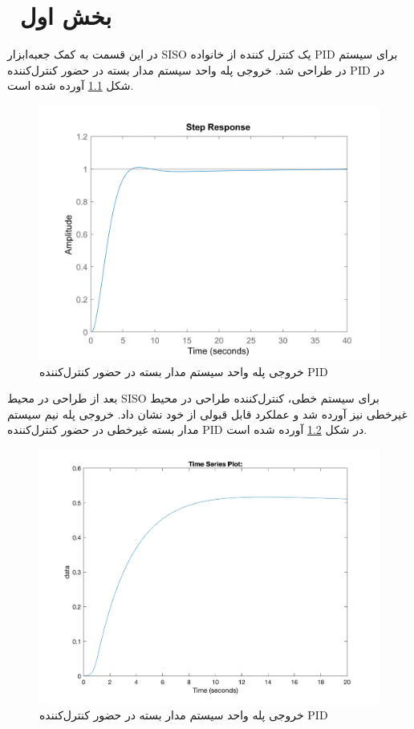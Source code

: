 \chapter{ بخش اول}
در این قسمت به کمک جعبه‌ابزار SISO یک کنترل کننده از خانواده PID برای سیستم در طراحی شد. خروجی پله واحد سیستم مدار بسته در حضور کنترل‌کننده PID در شکل
\ref{PID}
آورده شده است.
 \begin{figure}[H]
	\includegraphics[width=12cm]{../Figure/P_I/PID.png}
	\centering
	\caption{خروجی پله واحد سیستم مدار بسته در حضور کنترل‌کننده PID}
	\label{PID}
\end{figure}
 بعد از طراحی در محیط SISO برای سیستم خطی، کنترل‌کننده طراحی در محیط غیرخطی نیز آورده شد و عملکرد قابل قبولی از خود نشان داد.
 خروجی پله نیم سیستم مدار بسته غیرخطی در حضور کنترل‌کننده PID در شکل
\ref{PID_non}
 آورده شده است.
   \begin{figure}[H]
 	\includegraphics[width=12cm]{../Figure/P_I/PID_nonlinear.png}
 	\centering
 	\caption{خروجی پله واحد سیستم مدار بسته در حضور کنترل‌کننده PID}
 	\label{PID_non}
 \end{figure}

